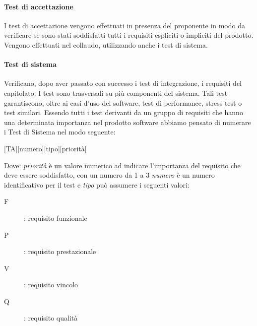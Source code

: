 \documentclass[../../norme-di-progetto.tex]{subfiles}
\begin{document}
\paragraph{Test di accettazione}
I test di accettazione vengono effettuati in presenza del proponente in modo da verificare se sono stati soddisfatti tutti i requisiti espliciti o impliciti del prodotto.
Vengono effettuati nel collaudo, utilizzando anche i test di sistema.

\paragraph{Test di sistema}
Verificano, dopo aver passato con successo i test di integrazione, i requisiti del capitolato. I test sono trasversali su più componenti del sistema.
Tali test garantiscono, oltre ai casi d'uso del software, test di performance, stress test o test similari.
Essendo tutti i test derivanti da un gruppo di requisiti che hanno una determinata importanza nel prodotto software abbiamo pensato di numerare i Test di Sistema nel modo seguente:
\begin{center}
    [TA][numero][tipo][priorità]
\end{center}
Dove: \textit{priorità} è un valore numerico ad indicare l'importanza del requisito che deve essere soddisfatto, con un numero da 1 a 3 \textit{numero} è un numero identificativo per il test e \textit{tipo} può assumere i seguenti valori:
\begin{description}
  \item [F]: requisito funzionale
  \item [P]: requisito prestazionale
  \item [V]: requisito vincolo
  \item [Q]: requisito qualità
\end{description}
\end{document}
